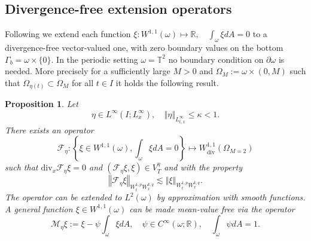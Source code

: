 \documentclass[10pt,a4paper]{article}
\newtheorem{proposition}[theorem]{Proposition}
\numberwithin{equation}{section}
\begin{document}
\subsection{Divergence-free extension operators}

Following \cite{Gr05, MS22} we extend each function $\xi:W^{1,1}\left(\omega\right)\mapsto\mathbb{R},\quad\int_{\omega}\xi dA=0$ to a divergence-free vector-valued one, with zero boundary values on the bottom $\Gamma_b = \omega\times\{0\}$. In the periodic setting $\omega=\mathbb{T}^{2}$ no boundary condition on $\partial\omega$ is needed. More precisely for a sufficiently large $M>0$ and $\Omega_{M}:=\omega\times\left(0,M\right)$ such that $\Omega_{\eta\left(t\right)}\subset \Omega_M$ for all $t\in I$
it holds the following result.
\begin{proposition}\label{chap-appendix-prop-extension-plate}
Let 
\[
\eta\in L^{\infty}\left(I;L_{x}^{\infty}\right),\quad\left\Vert \eta\right\Vert _{L_{t,x}^{\infty}}\le\kappa<1.
\]
There exists an operator 
\begin{equation}
\mathcal{F}_{\eta}:\left\{ \xi\in W^{1,1}\left(\omega\right),\int_{\omega}\xi dA=0\right\} \mapsto W_{\text{div}}^{1,1}\left(\Omega_{M=2}\right)
\end{equation}
such that $\text{div}_{x}\mathcal{F}_{\eta}\xi=0$ and $\left(\mathcal{F}_{\eta}\xi,\xi\right)\in V_{T}^{\eta}$ and 
with the property
\[
\left\Vert \mathcal{F}_{\eta}\xi\right\Vert _{W_{t}^{1,p}W_{x}^{k,q}}\lesssim\left\Vert \xi\right\Vert _{W_{t}^{1,p}W_{x}^{k,q}}.
\]
The operator can be extended to $L^2(\omega)$ by approximation with smooth functions.
A general function $\xi\in W^{1,1}\left(\omega\right)$ can be made  mean-value free via the operator
\begin{equation}
    \mathcal{M}_{\eta}\xi:=\xi-\psi\int_{\omega}\xi dA,\quad\psi\in C^{\infty}\left(\omega;\mathbb{R}\right),\quad\int_{\omega}\psi dA=1.
\end{equation}
\end{proposition}
\end{document}
